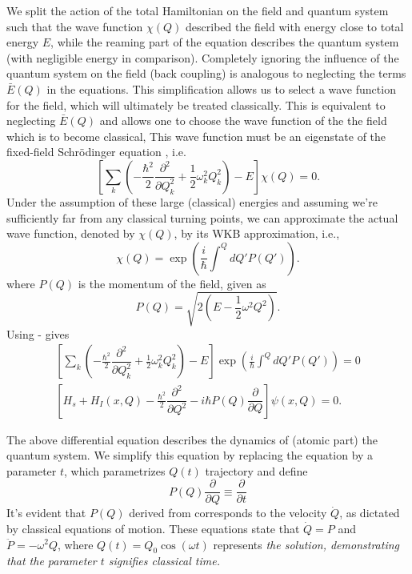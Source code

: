 We split the action of the total Hamiltonian on the field and quantum system such that the 
wave function \(\chi(Q)\) described the field with energy close to total energy \(E\), while 
the reaming part of the equation describes the quantum system (with negligible energy in comparison).
Completely ignoring the influence of the quantum system on the field (back coupling) is analogous 
to neglecting the terms \(\bar{E}(Q)\) in the equations. This simplification allows us 
to select a wave function for the field, which will ultimately be treated classically. 
This is equivalent to neglecting \(\bar{E}(Q)\) and allows one to choose the wave function of the
the field which is to become classical, This wave function must be an eigenstate of the fixed-field Schrödinger equation
, i.e.
\begin{equation}
    \label{eq:class_jcm_eq10}
    \left[\sum_k \left(-\frac{\hbar^2}{2}\dfrac{\partial^2}{\partial Q_k^2}
    + \frac{1}{2} \omega_k^2 Q_k^2\right)
    - E \right]\chi(Q) = 0.
\end{equation}
Under the assumption of these large (classical) energies and assuming we're sufficiently far from any 
classical turning points, we can approximate the actual wave function, denoted by $\chi(Q)$,
 by its WKB approximation, i.e., 
 \begin{equation}
    \label{eq:class_jcm_eq11}
    \chi(Q) = \exp\left(\frac{i}{\hbar}\int ^Q dQ' P(Q')\right).
 \end{equation}
where \(P(Q)\) is the momentum of the field, given as 
\begin{equation}
    \label{eq:class_jcm_eq12}
    P(Q) = \sqrt{2\left(E - \frac{1}{2}\omega^2 Q^2\right)}.
\end{equation}
Using  -  gives
\begin{eqnarray}
    \label{eq:class_jcm_eq13}
    \left[\sum_k \left(-\frac{\hbar^2}{2}\dfrac{\partial^2}{\partial Q_k^2}
    + \frac{1}{2} \omega_k^2 Q_k^2\right)
    - E \right]\exp\left(\frac{i}{\hbar}\int ^Q dQ' P(Q')\right) = 0 \nonumber \\
    \left[
        H_s + H_I(x, Q) - \frac{\hbar^2}{2} \dfrac{\partial^2}{\partial Q^2}
    - i\hbar P(Q) \dfrac{\partial}{\partial Q}\right] \psi(x, Q) = 0. 
\end{eqnarray}

The above differential equation describes the dynamics of (atomic part) 
the quantum system. We simplify this equation by replacing the equation by a parameter $t$, 
which parametrizes $Q(t)$ trajectory and define
\begin{equation}
    \label{eq:class_jcm_eq14}
    P(Q)\dfrac{\partial}{\partial Q} \equiv \dfrac{\partial }{\partial t}
\end{equation}
It's evident that $P(Q)$ derived from  corresponds to the velocity 
$\dot{Q}$, as dictated by classical equations of motion. These equations state that
$\dot{Q} = P$ and $\ddot{P} = -\omega^2 Q$, where $Q(t) = Q_0 \cos(\omega t)$ represents 
\textit{the solution, demonstrating that the parameter $t$ signifies classical time.}


